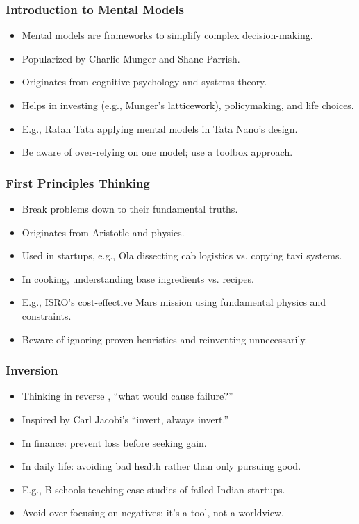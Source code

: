 \begin{frame}[fragile]\frametitle{Introduction to Mental Models}
  \begin{itemize}
    \item Mental models are frameworks to simplify complex decision-making.
    \item Popularized by Charlie Munger and Shane Parrish.
    \item Originates from cognitive psychology and systems theory.
    \item Helps in investing (e.g., Munger's latticework), policymaking, and life choices.
    \item E.g., Ratan Tata applying mental models in Tata Nano's design.
    \item Be aware of over-relying on one model; use a toolbox approach.
  \end{itemize}
\end{frame}

\begin{frame}[fragile]\frametitle{First Principles Thinking}
  \begin{itemize}
    \item Break problems down to their fundamental truths.
    \item Originates from Aristotle and physics.
    \item Used in startups, e.g., Ola dissecting cab logistics vs. copying taxi systems.
    \item In cooking, understanding base ingredients vs. recipes.
    \item E.g., ISRO's cost-effective Mars mission using fundamental physics and constraints.
    \item Beware of ignoring proven heuristics and reinventing unnecessarily.
  \end{itemize}
\end{frame}

\begin{frame}[fragile]\frametitle{Inversion}
  \begin{itemize}
    \item Thinking in reverse , ``what would cause failure?''
    \item Inspired by Carl Jacobi's ``invert, always invert.''
    \item In finance: prevent loss before seeking gain.
    \item In daily life: avoiding bad health rather than only pursuing good.
    \item E.g., B-schools teaching case studies of failed Indian startups.
    \item Avoid over-focusing on negatives; it's a tool, not a worldview.
  \end{itemize}
\end{frame}

